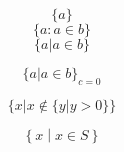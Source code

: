 \documentclass{article}
\begin{document}
\[ \{ a \} \]
\[ \{ a : a\in b \} \]
\[ \{ a | a\in b \} \]

\[ \{ a | a\in b \}_{c=0} \]

\[ \{ x | x \not\in \{ y | y > 0 \} \} \]

\[ \left\{ x \middle| x\in S \right\} \]
\end{document}
